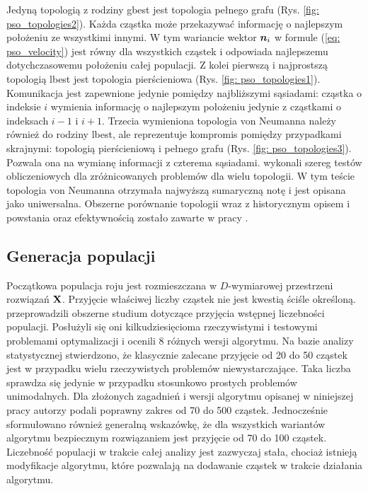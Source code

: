 Jedyną topologią z rodziny gbest jest topologia pełnego grafu (Rys. \ref{fig: pso_topologies2}). Każda cząstka może przekazywać informację o najlepszym położeniu ze wszystkimi innymi. W tym wariancie wektor $\bm{n}_i$ w formule (\ref{eq: pso_velocity}) jest równy dla wszystkich cząstek i odpowiada najlepszemu dotychczasowemu położeniu całej populacji. Z kolei pierwszą i najprostszą topologią lbest jest topologia pierścieniowa (Rys. \ref{fig: pso_topologies1}). Komunikacja jest zapewnione jedynie pomiędzy najbliższymi sąsiadami: cząstka o indeksie $i$ wymienia informację o najlepszym położeniu jedynie z cząstkami o indeksach $i-1$ i $i+1$. Trzecia wymieniona topologia von Neumanna należy również do rodziny lbest, ale reprezentuje kompromis pomiędzy przypadkami skrajnymi: topologią pierścieniową i pełnego grafu (Rys. \ref{fig: pso_topologies3}). Pozwala ona na wymianę informacji z czterema sąsiadami.\parencite{Kennedy2002} wykonali szereg testów obliczeniowych dla zróżnicowanych problemów dla wielu topologii. W tym teście topologia von Neumanna otrzymała najwyższą sumaryczną notę i jest opisana jako uniwersalna. Obszerne porównanie topologii wraz z historycznym opisem i powstania oraz efektywnością zostało zawarte w pracy \parencite{Blackwell2019}.

\subsection{Generacja populacji}
Początkowa populacja roju jest rozmieszczana w $D$-wymiarowej przestrzeni rozwiązań $\mathbf{X}$. Przyjęcie właściwej liczby cząstek nie jest kwestią ściśle określoną. \cite{Piotrowski2020} przeprowadzili obszerne studium dotyczące przyjęcia wstępnej liczebności populacji. Posłużyli się oni kilkudziesięcioma rzeczywistymi i testowymi problemami optymalizacji i ocenili 8 różnych wersji algorytmu. Na bazie analizy statystycznej stwierdzono, że klasycznie zalecane przyjęcie od 20 do 50 \parencite{Kennedy1995,Liang2006,Chen2012,Harrison2018} cząstek jest w przypadku wielu rzeczywistych problemów niewystarczające. Taka liczba sprawdza się jedynie w przypadku stosunkowo prostych problemów unimodalnych. Dla złożonych zagadnień i wersji algorytmu opisanej w niniejszej pracy autorzy podali poprawny zakres od 70 do 500 cząstek. Jednocześnie sformułowano również generalną wskazówkę, że dla wszystkich wariantów algorytmu bezpiecznym rozwiązaniem jest przyjęcie od 70 do 100 cząstek. Liczebność populacji w trakcie całej analizy jest zazwyczaj stała, chociaż istnieją modyfikacje algorytmu, które pozwalają na dodawanie cząstek w trakcie działania algorytmu.

